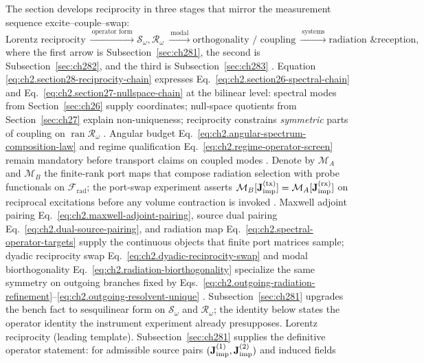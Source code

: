 The section develops reciprocity in three stages that mirror the measurement sequence excite--couple--swap:
\begin{equation}
\label{eq:ch2.section28-reciprocity-chain}
\text{Lorentz reciprocity}
\ \xrightarrow{\ \text{operator form}\ }
\mathcal{S}_\omega,\mathcal{R}_\omega
\ \xrightarrow{\ \text{modal}\ }
\text{orthogonality / coupling}
\ \xrightarrow{\ \text{systems}\ }
\text{radiation \& reception},
\end{equation}
where the first arrow is Subsection~\ref{sec:ch281}, the second is Subsection~\ref{sec:ch282},
and the third is Subsection~\ref{sec:ch283} \cite{stratton1941}. Equation
\eqref{eq:ch2.section28-reciprocity-chain} expresses Eq.~\eqref{eq:ch2.section26-spectral-chain}
and Eq.~\eqref{eq:ch2.section27-nullspace-chain} at the bilinear level: spectral modes from
Section~\ref{sec:ch26} supply coordinates; null-space quotients from Section~\ref{sec:ch27}
explain non-uniqueness; reciprocity constrains \emph{symmetric} parts of coupling on
\(\operatorname{ran}\mathcal{R}_\omega\) \cite{stratton1941}. Angular budget
Eq.~\eqref{eq:ch2.angular-spectrum-composition-law} and regime qualification
Eq.~\eqref{eq:ch2.regime-operator-screen} remain mandatory before transport claims on coupled
modes \cite{harrington2001}.
Denote by $\mathcal{M}_A$ and $\mathcal{M}_B$ the finite-rank port maps that compose radiation
selection with probe functionals on $\mathcal{F}_{\mathrm{rad}}$; the port-swap experiment asserts
$\mathcal{M}_B[\mathbf{J}_{\mathrm{imp}}^{\mathrm{(tx)}}]=\mathcal{M}_A[\mathbf{J}_{\mathrm{imp}}^{\mathrm{(rx)}}]$ on reciprocal
excitations before any volume contraction is invoked \cite{harrington2001}. Maxwell adjoint pairing
Eq.~\eqref{eq:ch2.maxwell-adjoint-pairing}, source dual pairing
Eq.~\eqref{eq:ch2.dual-source-pairing}, and radiation map
Eq.~\eqref{eq:ch2.spectral-operator-targets} supply the continuous objects that finite port
matrices sample; dyadic reciprocity swap Eq.~\eqref{eq:ch2.dyadic-reciprocity-swap} and modal
biorthogonality Eq.~\eqref{eq:ch2.radiation-biorthogonality} specialize the same symmetry on
outgoing branches fixed by
Eqs.~\eqref{eq:ch2.outgoing-radiation-refinement}--\eqref{eq:ch2.outgoing-resolvent-unique}
\cite{stratton1941}. Subsection~\ref{sec:ch281} upgrades the bench fact to
sesquilinear form on $\mathcal{S}_\omega$ and $\mathcal{R}_\omega$; the identity below states the
operator identity the instrument experiment already presupposes.
Lorentz reciprocity (leading template). Subsection~\ref{sec:ch281} supplies the definitive operator statement: for
admissible source pairs \((\mathbf{J}_{\mathrm{imp}}^{(1)},\mathbf{J}_{\mathrm{imp}}^{(2)})\) and induced fields
